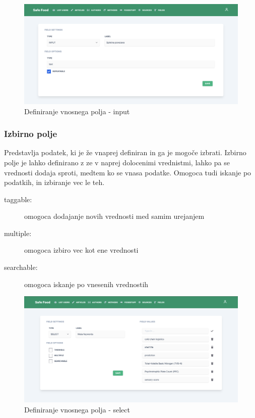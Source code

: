\documentclass[a4paper, 12pt]{book}
\begin{document}
\begin{figure}[h]
\begin{center}
\includegraphics[width=1\textwidth]{slike/type_input.png}
\end{center}
\caption{ Definiranje vnosnega polja - input }
\label{type-input}
\end{figure}


\subsubsection{Izbirno polje}
Predstavlja podatek, ki je že vnaprej definiran in ga je mogoče izbrati. Izbirno polje je lahko definirano z ze v naprej dolocenimi vrednistmi, lahko pa se vrednosti dodaja sproti, medtem ko se vnasa podatke. Omogoca tudi iskanje po podatkih, in izbiranje vec le teh.
\begin{description}
     \item[taggable:] omogoca dodajanje novih vrednosti med samim urejanjem
     \item[multiple:] omogoca izbiro vec kot ene vrednosti
     \item[searchable:] omogoca iskanje po vnesenih vrednostih
 \end{description}

\begin{figure}[h]
\begin{center}
\includegraphics[width=1\textwidth]{slike/type_select.png}
\end{center}
\caption{ Definiranje vnosnega polja - select }
\label{type-select}
\end{figure}
\end{document}
